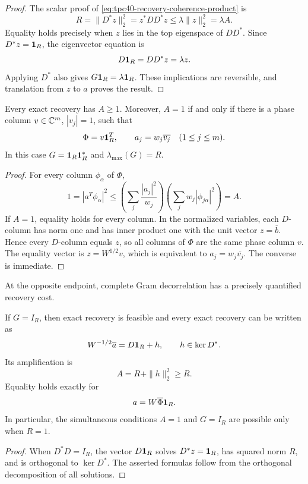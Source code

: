 \begin{proof}
The scalar proof of \eqref{eq:tpc40-recovery-coherence-product} is
\[
 R=\|D^*z\|_2^2
   =z^*DD^*z
 \le\lambda\|z\|_2^2=\lambda A.
\]
Equality holds precisely when \(z\) lies in the top eigenspace of
\(DD^*\).  Since \(D^*z=\mathbf 1_R\), the eigenvector equation is
\[
 D\mathbf 1_R=DD^*z=\lambda z.
\]
Applying \(D^*\) also gives \(G\mathbf 1_R=\lambda\mathbf 1_R\).  These implications
are reversible, and translation from \(z\) to \(a\) proves the result.
\end{proof}

\begin{proposition}
\label{prop:tpc40-unit-amplification-rigidity}
Every exact recovery has \(A\ge1\).  Moreover, \(A=1\) if and only if
there is a phase column \(v\in\mathbb C^m\), \(|v_j|=1\), such that
\begin{equation}
 \Phi=v\mathbf 1_R^T,
 \qquad
 a_j=w_j\overline{v_j}\quad(1\le j\le m).
 \label{eq:tpc40-unit-amplification-rigid-form}
\end{equation}
In this case \(G=\mathbf 1_R\mathbf 1_R^*\) and
\(\lambda_{\max}(G)=R\).
\end{proposition}

\begin{proof}
For every column \(\phi_\alpha\) of \(\Phi\),
\[
 1=|a^T\phi_\alpha|^2
 \le\left(\sum_j\frac{|a_j|^2}{w_j}\right)
     \left(\sum_jw_j|\phi_{j\alpha}|^2\right)=A.
\]
If \(A=1\), equality holds for every column.  In the normalized variables,
each \(D\)-column has norm one and has inner product one with the unit
vector \(z=\overline b\).  Hence every \(D\)-column equals \(z\), so all
columns of \(\Phi\) are the same phase column \(v\).  The equality vector
is \(z=W^{1/2}v\), which is equivalent to
\(a_j=w_j\overline{v_j}\).  The converse is immediate.
\end{proof}

At the opposite endpoint, complete Gram decorrelation has a precisely
quantified recovery cost.

\begin{proposition}
\label{prop:tpc40-orthogonal-Gram-cost}
If \(G=I_R\), then exact recovery is feasible and every exact recovery can
be written as
\begin{equation}
 W^{-1/2}\overline a=D\mathbf 1_R+h,
 \qquad h\in\ker D^*.
 \label{eq:tpc40-orthogonal-all-solutions}
\end{equation}
Its amplification is
\begin{equation}
 \boxed{A=R+\|h\|_2^2\ge R.}
 \label{eq:tpc40-orthogonal-cost}
\end{equation}
Equality holds exactly for
\begin{equation}
 a=W\overline\Phi\mathbf 1_R.
 \label{eq:tpc40-orthogonal-minimizer}
\end{equation}
In particular, the simultaneous conditions \(A=1\) and \(G=I_R\) are
possible only when \(R=1\).
\end{proposition}

\begin{proof}
When \(D^*D=I_R\), the vector \(D\mathbf 1_R\) solves
\(D^*z=\mathbf 1_R\), has squared norm \(R\), and is orthogonal to
\(\ker D^*\).  The asserted formulas follow from the orthogonal
decomposition of all solutions.
\end{proof}
